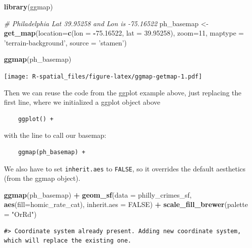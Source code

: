 \documentclass[]{book}
\newenvironment{Shaded}{\begin{snugshade}}{\end{snugshade}}
\newcommand{\KeywordTok}[1]{\textcolor[rgb]{0.13,0.29,0.53}{\textbf{#1}}}
\newcommand{\DataTypeTok}[1]{\textcolor[rgb]{0.13,0.29,0.53}{#1}}
\newcommand{\DecValTok}[1]{\textcolor[rgb]{0.00,0.00,0.81}{#1}}
\newcommand{\FloatTok}[1]{\textcolor[rgb]{0.00,0.00,0.81}{#1}}
\newcommand{\StringTok}[1]{\textcolor[rgb]{0.31,0.60,0.02}{#1}}
\newcommand{\CommentTok}[1]{\textcolor[rgb]{0.56,0.35,0.01}{\textit{#1}}}
\newcommand{\OtherTok}[1]{\textcolor[rgb]{0.56,0.35,0.01}{#1}}
\newcommand{\OperatorTok}[1]{\textcolor[rgb]{0.81,0.36,0.00}{\textbf{#1}}}
\newcommand{\NormalTok}[1]{#1}
\begin{document}
\begin{Shaded}
\begin{Highlighting}[]
\KeywordTok{library}\NormalTok{(ggmap)}

\CommentTok{# Philadelphia Lat 39.95258 and Lon is -75.16522}
\NormalTok{ph_basemap <-}\StringTok{ }\KeywordTok{get_map}\NormalTok{(}\DataTypeTok{location=}\KeywordTok{c}\NormalTok{(}\DataTypeTok{lon =} \OperatorTok{-}\FloatTok{75.16522}\NormalTok{, }\DataTypeTok{lat =} \FloatTok{39.95258}\NormalTok{), }\DataTypeTok{zoom=}\DecValTok{11}\NormalTok{, }\DataTypeTok{maptype =} \StringTok{'terrain-background'}\NormalTok{, }\DataTypeTok{source =} \StringTok{'stamen'}\NormalTok{)}

\KeywordTok{ggmap}\NormalTok{(ph_basemap)}
\end{Highlighting}
\end{Shaded}

\texttt{[image: R-spatial\_files/figure-latex/ggmap-getmap-1.pdf]}

Then we can reuse the code from the ggplot example above, just replacing
the first line, where we initialized a ggplot object above

\begin{verbatim}
    ggplot() + 
\end{verbatim}

with the line to call our basemap:

\begin{verbatim}
    ggmap(ph_basemap) +
\end{verbatim}

We also have to set \texttt{inherit.aes} to \texttt{FALSE}, so it
overrides the default aesthetics (from the ggmap object).

\begin{Shaded}
\begin{Highlighting}[]
\KeywordTok{ggmap}\NormalTok{(ph_basemap) }\OperatorTok{+}
\StringTok{    }\KeywordTok{geom_sf}\NormalTok{(}\DataTypeTok{data =}\NormalTok{ philly_crimes_sf, }\KeywordTok{aes}\NormalTok{(}\DataTypeTok{fill=}\NormalTok{homic_rate_cat), }\DataTypeTok{inherit.aes =} \OtherTok{FALSE}\NormalTok{) }\OperatorTok{+}
\StringTok{    }\KeywordTok{scale_fill_brewer}\NormalTok{(}\DataTypeTok{palette =} \StringTok{"OrRd"}\NormalTok{)}
\end{Highlighting}
\end{Shaded}

\begin{verbatim}
#> Coordinate system already present. Adding new coordinate system, which will replace the existing one.
\end{verbatim}
\end{document}
